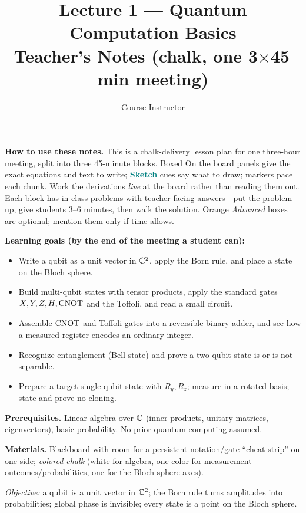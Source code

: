 \documentclass[11pt]{article}
\title{\textbf{Lecture 1 --- Quantum Computation Basics}\\[0.3em]\large Teacher's Notes (chalk, one 3$\times$45\,min meeting)}
\author{Course Instructor}
\date{}
\begin{document}
\maketitle

\noindent\textbf{How to use these notes.} This is a chalk-delivery lesson plan for
one three-hour meeting, split into three 45-minute blocks. Boxed \textsf{On the
board} panels give the exact equations and text to write; \textcolor{teal}{\textbf{Sketch}}
cues say what to draw;  markers pace each chunk. Work the derivations
\emph{live} at the board rather than reading them out. Each block has in-class
problems with teacher-facing answers---put the problem up, give students 3--6
minutes, then walk the solution. Orange \emph{Advanced} boxes are optional; mention
them only if time allows.

\medskip
\noindent\textbf{Learning goals (by the end of the meeting a student can):}
\begin{itemize}[leftmargin=1.4em,nosep]
  \item Write a qubit as a unit vector in $\mathbb{C}^2$, apply the Born rule, and place a state on the Bloch sphere.
  \item Build multi-qubit states with tensor products, apply the standard gates $X,Y,Z,H,\mathrm{CNOT}$ and the Toffoli, and read a small circuit.
  \item Assemble $\mathrm{CNOT}$ and Toffoli gates into a reversible binary adder, and see how a measured register encodes an ordinary integer.
  \item Recognize entanglement (Bell state) and prove a two-qubit state is or is not separable.
  \item Prepare a target single-qubit state with $R_y,R_z$; measure in a rotated basis; state and prove no-cloning.
\end{itemize}

\medskip
\noindent\textbf{Prerequisites.} Linear algebra over $\mathbb{C}$ (inner products, unitary
matrices, eigenvectors), basic probability. No prior quantum computing assumed.

\medskip
\noindent\textbf{Materials.} Blackboard with room for a persistent
notation/gate ``cheat strip'' on one side; \emph{colored chalk} (white for algebra,
one color for measurement outcomes/probabilities, one for the Bloch sphere axes).

\noindent\emph{Objective:} a qubit is a unit vector in $\mathbb{C}^2$; the Born rule turns
amplitudes into probabilities; global phase is invisible; every state is a point on
the Bloch sphere.
\end{document}
